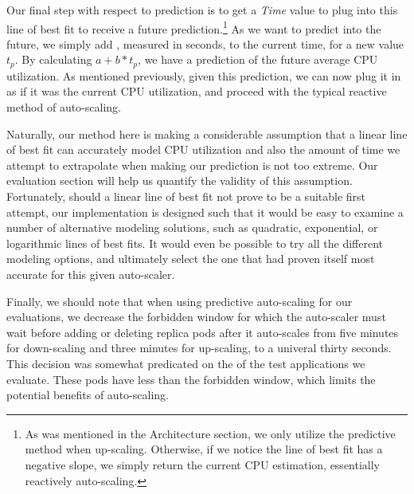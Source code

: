 Our final step with respect to prediction is
to get a \textit{Time} value to plug into this line of best
fit to receive a future prediction.\footnote{As was mentioned in the
Architecture section, we only utilize the predictive method when up-scaling.
Otherwise, if we notice the line of best fit has a negative slope, we simply
return the current CPU estimation, essentially reactively auto-scaling.}
As we want to predict
 into the future, we simply add
, measured in seconds, to the current time, for a
new value $t_{p}$. By calculating $a + b * t_{p}$, we have a prediction of the
future average CPU utilization. As mentioned previously, given this prediction,
we can now plug it in as if it was the current CPU utilization, and proceed with
the typical reactive method of auto-scaling.

Naturally, our method here is making a considerable assumption that a linear
line of best fit can accurately model CPU utilization and also the amount of
time we attempt to extrapolate when making our prediction is not too extreme.
Our evaluation section will help us quantify the validity of this assumption.
Fortunately, should a linear line of best fit
not prove to be a suitable first attempt, our implementation is designed such
that it would be easy to examine a number of alternative modeling solutions,
such as quadratic, exponential, or logarithmic lines of best fits. It would even
be possible to try all the different modeling options, and ultimately select
the one that had proven itself most accurate for this given auto-scaler.

Finally, we should note that when using predictive auto-scaling for our
evaluations, we decrease the forbidden window for which the auto-scaler must
wait before adding or deleting replica pods after it auto-scales from five
minutes for down-scaling and three minutes for up-scaling, to a univeral thirty
seconds. This decision was somewhat predicated on the
 of the test applications we evaluate. These pods
have  less than the forbidden window, which limits
the potential benefits of auto-scaling.

